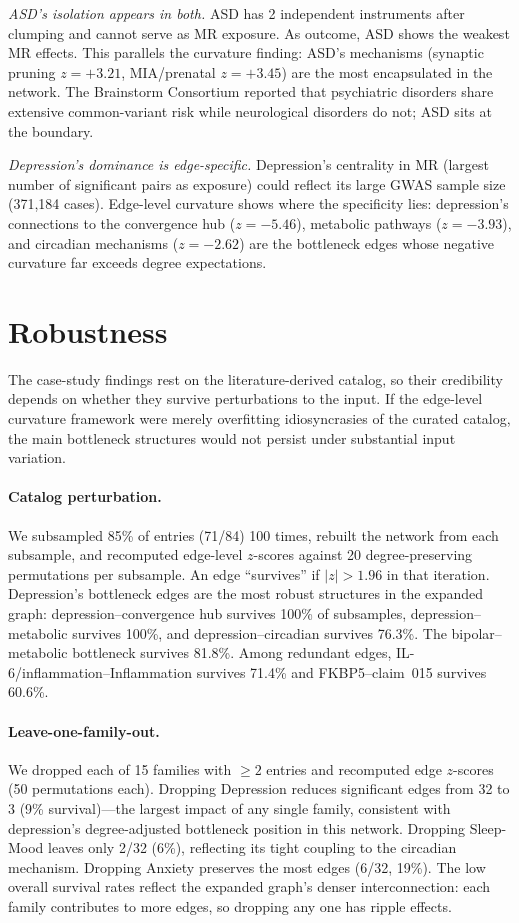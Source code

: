 \documentclass[11pt]{article}
\begin{document}
\emph{ASD's isolation appears in both.} ASD has 2 independent instruments after clumping and cannot serve as MR exposure. As outcome, ASD shows the weakest MR effects. This parallels the curvature finding: ASD's mechanisms (synaptic pruning $z = +3.21$, MIA/prenatal $z = +3.45$) are the most encapsulated in the network. The Brainstorm Consortium \citep{anttila2018analysis} reported that psychiatric disorders share extensive common-variant risk while neurological disorders do not; ASD sits at the boundary.

\emph{Depression's dominance is edge-specific.} Depression's centrality in MR (largest number of significant pairs as exposure) could reflect its large GWAS sample size (371,184 cases). Edge-level curvature shows where the specificity lies: depression's connections to the convergence hub ($z = -5.46$), metabolic pathways ($z = -3.93$), and circadian mechanisms ($z = -2.62$) are the bottleneck edges whose negative curvature far exceeds degree expectations.

\section{Robustness}
\label{sec:robustness}

The case-study findings rest on the literature-derived catalog, so their credibility depends on whether they survive perturbations to the input. If the edge-level curvature framework were merely overfitting idiosyncrasies of the curated catalog, the main bottleneck structures would not persist under substantial input variation.

\paragraph{Catalog perturbation.} We subsampled 85\% of entries (71/84) 100 times, rebuilt the network from each subsample, and recomputed edge-level $z$-scores against 20 degree-preserving permutations per subsample. An edge ``survives'' if $|z| > 1.96$ in that iteration. Depression's bottleneck edges are the most robust structures in the expanded graph: depression--convergence hub survives 100\% of subsamples, depression--metabolic survives 100\%, and depression--circadian survives 76.3\%. The bipolar--metabolic bottleneck survives 81.8\%. Among redundant edges, IL-6/inflammation--Inflammation survives 71.4\% and FKBP5--claim~015 survives 60.6\%.

\paragraph{Leave-one-family-out.} We dropped each of 15 families with $\geq 2$ entries and recomputed edge $z$-scores (50 permutations each). Dropping Depression reduces significant edges from 32 to 3 (9\% survival)---the largest impact of any single family, consistent with depression's degree-adjusted bottleneck position in this network. Dropping Sleep-Mood leaves only 2/32 (6\%), reflecting its tight coupling to the circadian mechanism. Dropping Anxiety preserves the most edges (6/32, 19\%). The low overall survival rates reflect the expanded graph's denser interconnection: each family contributes to more edges, so dropping any one has ripple effects.
\end{document}
